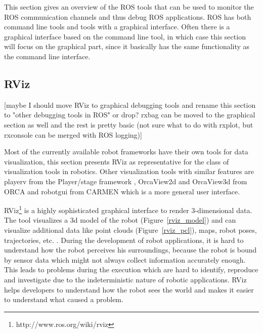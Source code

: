 This section gives an overview of the ROS tools that can be used to monitor the ROS communication channels and thus debug ROS applications. ROS has both command line tools and tools with a graphical interface. Often there is a graphical interface based on the command line tool, in which case this section will focus on the graphical part, since it basically has the same functionality as the command line interface.


\subsection{RViz}
\label{rviz}
[maybe I should move RViz to graphical debugging tools and rename this section to "other debugging tools in ROS" or drop? rxbag can be moved to the graphical section as well and the rest is pretty basic (not sure what to do with rxplot, but rxconsole can be merged with ROS logging)]

Most of the currently available robot frameworks have their own tools for data visualization, this section presents RViz as representative for the class of visualization tools in robotics. Other visualization tools with similar features are playerv from the Player/stage framework \cite{Gerkey2003}, OrcaView2d and OrcaView3d from ORCA \cite{Makarenko2006} and robotgui from CARMEN \cite{Montemerlo2003} which is a more general user interface.

RViz\footnote{http://www.ros.org/wiki/rviz} is a highly sophisticated graphical interface to render 3-dimensional data. The tool visualizes a 3d model of the robot (Figure~\ref{rviz_model}) and can visualize additional data like point clouds (Figure~\ref{rviz_pcl}), maps, robot poses, trajectories, etc. \cite{Quigley2009}. During the development of robot applications, it is hard to understand how the robot perceives his surroundings, because the robot is bound by sensor data which might not always collect information accurately enough. This leads to problems during the execution which are hard to identify, reproduce and investigate due to the indeterministic nature of robotic applications. RViz helps developers to understand how the robot sees the world and makes it easier to understand what caused a problem.

